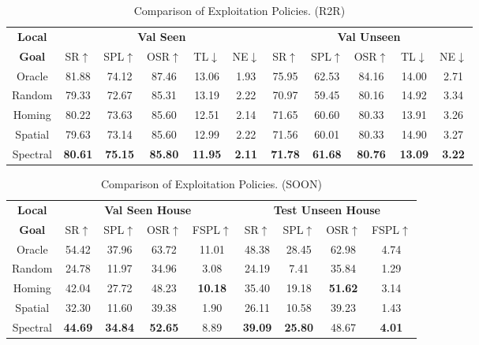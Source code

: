 \documentclass[10pt,twocolumn,letterpaper]{article}
\begin{document}
\begin{table}[htb!]
\renewcommand{\arraystretch}{0.9}
\setlength{\tabcolsep}{2.5pt}
\fontsize{7}{8}\selectfont
\begin{tabular}{c|ccccc|ccccc}
\toprule
\textbf{Local} & \multicolumn{5}{c|}{\textbf{Val Seen}} & \multicolumn{5}{c}{\textbf{Val Unseen}}\\
\textbf{Goal} & SR$\uparrow$ & SPL$\uparrow$ & OSR$\uparrow$ & TL$\downarrow$ & NE$\downarrow$ & SR$\uparrow$ & SPL$\uparrow$ & OSR$\uparrow$ & TL$\downarrow$ & NE$\downarrow$ \\ \hline\hline
Oracle & 81.88 & 74.12 & 87.46 & 13.06 & 1.93 & 75.95 & 62.53 & 84.16 & 14.00 & 2.71 \\ \hline
Random  & 79.33 & 72.67 & 85.31 & 13.19 & 2.22 & 70.97 & 59.45 & 80.16 & 14.92 & 3.34 \\
Homing  & 80.22 & 73.63 & 85.60 & 12.51 & 2.14 & 71.65 & 60.60 & 80.33 & 13.91 & 3.26 \\
Spatial  & 79.63 & 73.14 & 85.60 & 12.99 & 2.22 & 71.56 & 60.01 & 80.33 & 14.90 & 3.27 \\
\rowcolor{LightCyan}Spectral  & \textbf{80.61} & \textbf{75.15} & \textbf{85.80} & \textbf{11.95} & \textbf{2.11} & \textbf{71.78} & \textbf{61.68} & \textbf{80.76} & \textbf{13.09} & \textbf{3.22} \\
\bottomrule
\end{tabular}\vspace{-0.2cm}
\caption{\small Comparison of Exploitation Policies. (R2R)
}
\label{tab:localgoal_compare_results-r2r}\vspace{-0.6cm}
\end{table}
\begin{table}[htb!]
\renewcommand{\arraystretch}{0.9}
\setlength{\tabcolsep}{4.06pt}
\fontsize{7}{8}\selectfont
\begin{tabular}{c|cccc|cccc}
\toprule
\textbf{Local} & \multicolumn{4}{c|}{\textbf{Val Seen House}} & \multicolumn{4}{c}{\textbf{Test Unseen House}}\\
\textbf{Goal} & SR$\uparrow$ & SPL$\uparrow$ & OSR$\uparrow$ & FSPL$\uparrow$ & SR$\uparrow$ & SPL$\uparrow$ & OSR$\uparrow$ & FSPL$\uparrow$ \\ \hline\hline
Oracle  & 54.42 & 37.96 & 63.72 & 11.01 & 48.38 & 28.45 & 62.98 & 4.74 \\ \hline
Random   & 24.78 & 11.97 & 34.96 & 3.08 & 24.19 & 7.41 & 35.84 & 1.29 \\
Homing   & 42.04 & 27.72 & 48.23 & \textbf{10.18} & 35.40 & 19.18 & \textbf{51.62} & 3.14 \\
Spatial  & 32.30 & 11.60 & 39.38 & 1.90 & 26.11 & 10.58 & 39.23 & 1.43 \\
\rowcolor{LightCyan}Spectral & \textbf{44.69} & \textbf{34.84} & \textbf{52.65} & 8.89 & \textbf{39.09} & \textbf{25.80} & 48.67 & \textbf{4.01} \\
\bottomrule
\end{tabular}\vspace{-0.2cm}
\caption{\small Comparison of Exploitation Policies. (SOON)
}
\label{tab:localgoal_compare_results-soon}\vspace{-0.8cm}
\end{table}
\end{document}
